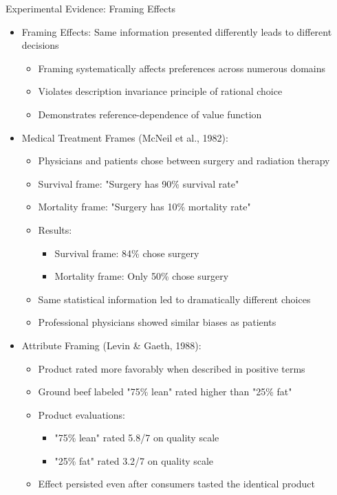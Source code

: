 \documentclass[10pt,handout]{beamer}
\begin{document}
\begin{frame}{Experimental Evidence: Framing Effects}
  \begin{itemize}[<+->]
    \item Framing Effects: Same information presented differently leads to different decisions
      \begin{itemize}
        \item Framing systematically affects preferences across numerous domains
        \item Violates description invariance principle of rational choice
        \item Demonstrates reference-dependence of value function
      \end{itemize}
    \item Medical Treatment Frames (McNeil et al., 1982):
      \begin{itemize}
        \item Physicians and patients chose between surgery and radiation therapy
        \item Survival frame: "Surgery has 90\% survival rate"
        \item Mortality frame: "Surgery has 10\% mortality rate"
        \item Results:
          \begin{itemize}
            \item Survival frame: 84\% chose surgery
            \item Mortality frame: Only 50\% chose surgery
          \end{itemize}
        \item Same statistical information led to dramatically different choices
        \item Professional physicians showed similar biases as patients
      \end{itemize}
    \item Attribute Framing (Levin \& Gaeth, 1988):
      \begin{itemize}
        \item Product rated more favorably when described in positive terms
        \item Ground beef labeled "75\% lean" rated higher than "25\% fat"
        \item Product evaluations: 
          \begin{itemize}
            \item "75\% lean" rated 5.8/7 on quality scale
            \item "25\% fat" rated 3.2/7 on quality scale
          \end{itemize}
        \item Effect persisted even after consumers tasted the identical product
      \end{itemize}
  \end{itemize}
\end{frame}
\end{document}

